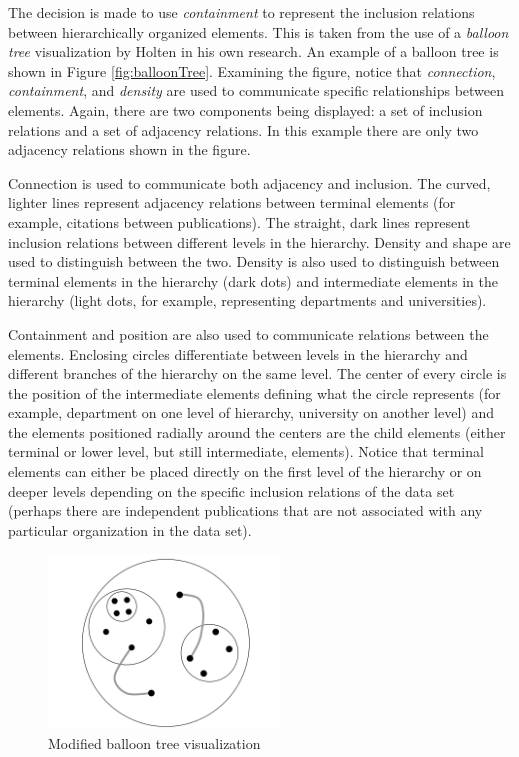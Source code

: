 The decision is made to use \emph{containment} to represent the inclusion relations between hierarchically organized elements. This is taken from the use of a \emph{balloon tree} visualization by Holten in his own research. An example of a balloon tree is shown in Figure \ref{fig:balloonTree}. Examining the figure, notice that \emph{connection}, \emph{containment}, and \emph{density} are used to communicate specific relationships between elements. Again, there are two components being displayed: a set of inclusion relations and a set of adjacency relations. In this example there are only two adjacency relations shown in the figure. 

Connection is used to communicate both adjacency and inclusion. The curved, lighter lines represent adjacency relations between terminal elements (for example, citations between publications). The straight, dark lines represent inclusion relations between different levels in the hierarchy. Density and shape are used to distinguish between the two. Density is also used to distinguish between terminal elements in the hierarchy (dark dots) and intermediate elements in the hierarchy (light dots, for example, representing departments and universities). 

Containment and position are also used to communicate relations between the elements. Enclosing circles differentiate between levels in the hierarchy and different branches of the hierarchy on the same level. The center of every circle is the position of the intermediate elements defining what the circle represents (for example, department on one level of hierarchy, university on another level) and the elements positioned radially around the centers are the child elements (either terminal or lower level, but still intermediate, elements). Notice that terminal elements can either be placed directly on the first level of the hierarchy or on deeper levels depending on the specific inclusion relations of the data set (perhaps there are independent publications that are not associated with any particular organization in the data set).

\begin{figure}[htb]
\centering
\includegraphics[width=0.55\textwidth]{vijay_balloon.png}
\caption{Modified balloon tree visualization}
\label{fig:balloon}
\end{figure}

